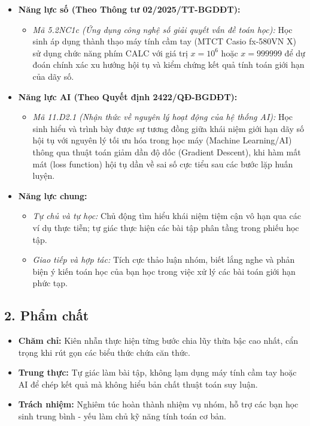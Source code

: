 \documentclass[12pt, a4paper]{article}
\begin{document}
\begin{itemize}[leftmargin=1.2cm]
    \item \textbf{Năng lực số (Theo Thông tư 02/2025/TT-BGDĐT):}
    \begin{itemize}[leftmargin=0.6cm]
        \item \textit{Mã 5.2NC1c (Ứng dụng công nghệ số giải quyết vấn đề toán học):} Học sinh áp dụng thành thạo máy tính cầm tay (MTCT Casio fx-580VN X) sử dụng chức năng phím CALC với giá trị $x = 10^6$ hoặc $x = 999999$ để dự đoán chính xác xu hướng hội tụ và kiểm chứng kết quả tính toán giới hạn của dãy số.
    \end{itemize}

    \item \textbf{Năng lực AI (Theo Quyết định 2422/QĐ-BGDĐT):}
    \begin{itemize}[leftmargin=0.6cm]
        \item \textit{Mã 11.D2.1 (Nhận thức về nguyên lý hoạt động của hệ thống AI):} Học sinh hiểu và trình bày được sự tương đồng giữa khái niệm giới hạn dãy số hội tụ với nguyên lý tối ưu hóa trong học máy (Machine Learning/AI) thông qua thuật toán giảm dần độ dốc (Gradient Descent), khi hàm mất mát (loss function) hội tụ dần về sai số cực tiểu sau các bước lặp huấn luyện.
    \end{itemize}

    \item \textbf{Năng lực chung:}
    \begin{itemize}[leftmargin=0.6cm]
        \item \textit{Tự chủ và tự học:} Chủ động tìm hiểu khái niệm tiệm cận vô hạn qua các ví dụ thực tiễn; tự giác thực hiện các bài tập phân tầng trong phiếu học tập.
        \item \textit{Giao tiếp và hợp tác:} Tích cực thảo luận nhóm, biết lắng nghe và phản biện ý kiến toán học của bạn học trong việc xử lý các bài toán giới hạn phức tạp.
    \end{itemize}
\end{itemize}

\subsection*{2. Phẩm chất}

\begin{itemize}[leftmargin=1.2cm]
    \item \textbf{Chăm chỉ:} Kiên nhẫn thực hiện từng bước chia lũy thừa bậc cao nhất, cẩn trọng khi rút gọn các biểu thức chứa căn thức.
    \item \textbf{Trung thực:} Tự giác làm bài tập, không lạm dụng máy tính cầm tay hoặc AI để chép kết quả mà không hiểu bản chất thuật toán suy luận.
    \item \textbf{Trách nhiệm:} Nghiêm túc hoàn thành nhiệm vụ nhóm, hỗ trợ các bạn học sinh trung bình - yếu làm chủ kỹ năng tính toán cơ bản.
\end{itemize}
\end{document}
